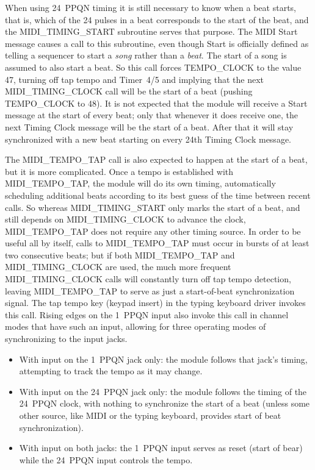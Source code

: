 When using 24~PPQN timing it is still necessary to know when a beat starts,
that is, which of the 24 pulses in a beat corresponds to the start of the
beat, and the MIDI\_TIMING\_START subroutine serves that purpose.  The MIDI
Start message causes a call to this subroutine, even though Start is
officially defined as telling a sequencer to start a \emph{song} rather than
a \emph{beat}.  The start of a song is assumed to also start a beat.  So
this call forces TEMPO\_CLOCK to the value 47, turning off tap tempo and
Timer~4/5 and implying that the next MIDI\_TIMING\_CLOCK call will be the
start of a beat (pushing TEMPO\_CLOCK to 48).  It is not expected that the
module will receive a Start message at the start of every beat; only that
whenever it does receive one, the next Timing Clock message will be the
start of a beat.  After that it will stay synchronized with a new beat
starting on every 24th Timing Clock message.

The MIDI\_TEMPO\_TAP call is also expected to happen at the start of a beat,
but it is more complicated.  Once a tempo is established with
MIDI\_TEMPO\_TAP, the module will do its own timing, automatically
scheduling additional beats according to its best guess of the time between
recent calls.  So whereas MIDI\_TIMING\_START only marks the start of a
beat, and still depends on MIDI\_TIMING\_CLOCK to advance the clock,
MIDI\_TEMPO\_TAP does not require any other timing source.  In order to be
useful all by itself, calls to MIDI\_TEMPO\_TAP must occur in bursts of at
least two consecutive beats; but if both MIDI\_TEMPO\_TAP and
MIDI\_TIMING\_CLOCK are used, the much more frequent MIDI\_TIMING\_CLOCK
calls will constantly turn off tap tempo detection, leaving MIDI\_TEMPO\_TAP
to serve as just a start-of-beat synchronization signal.  The tap tempo key
(keypad insert) in the typing keyboard driver invokes this call.  Rising
edges on the 1~PPQN input also invoke this call in channel modes that have
such an input, allowing for three operating modes of synchronizing to the
input jacks.

\begin{itemize}
  \item With input on the 1~PPQN jack only:  the module follows that jack's
    timing, attempting to track the tempo as it may change.
  \item With input on the 24~PPQN jack only:  the module follows the timing
    of the 24~PPQN clock, with nothing to synchronize the start of a beat
    (unless some other source, like MIDI or the typing keyboard, provides
    start of beat synchronization).
  \item With input on both jacks:  the 1~PPQN input serves as reset (start of
    bear) while the 24~PPQN input controls the tempo.
\end{itemize}

